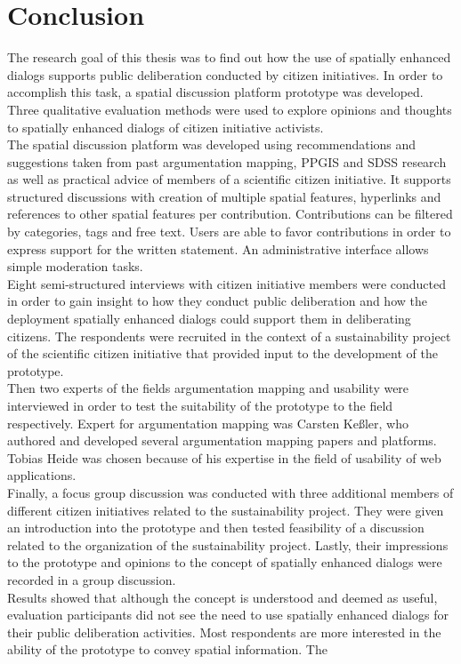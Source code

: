 \section{Conclusion}
\label{chap:conclusion}
The research goal of this thesis was to find out how the use of spatially enhanced dialogs supports public deliberation conducted by citizen initiatives. In order to accomplish this task, a spatial discussion platform prototype was developed. Three qualitative evaluation methods were used to explore opinions and thoughts to spatially enhanced dialogs of citizen initiative activists.\\
The spatial discussion platform was developed using recommendations and suggestions taken from past argumentation mapping, PPGIS and SDSS research as well as practical advice of members of a scientific citizen initiative. It supports structured discussions with creation of multiple spatial features, hyperlinks and references to other spatial features per contribution. Contributions can be filtered by categories, tags and free text. Users are able to favor contributions in order to express support for the written statement. An administrative interface allows simple moderation tasks.\\
Eight semi-structured interviews with citizen initiative members were conducted in order to gain insight to how they conduct public deliberation and how the deployment spatially enhanced dialogs could support them in deliberating citizens. The respondents were recruited in the context of a sustainability project of the scientific citizen initiative that provided input to the development of the prototype.\\
Then two experts of the fields argumentation mapping and usability were interviewed in order to test the suitability of the prototype to the field respectively. Expert for argumentation mapping was Carsten Keßler, who authored and developed several argumentation mapping papers and platforms. Tobias Heide was chosen because of his expertise in the field of usability of web applications.\\
Finally, a focus group discussion was conducted with three additional members of different citizen initiatives related to the sustainability project. They were given an introduction into the prototype and then tested feasibility of a discussion related to the organization of the sustainability project. Lastly, their impressions to the prototype and opinions to the concept of spatially enhanced dialogs were recorded in a group discussion.\\
Results showed that although the concept is understood and deemed as useful, evaluation participants did not see the need to use spatially enhanced dialogs for their public deliberation activities. Most respondents are more interested in the ability of the prototype to convey spatial information. The 





